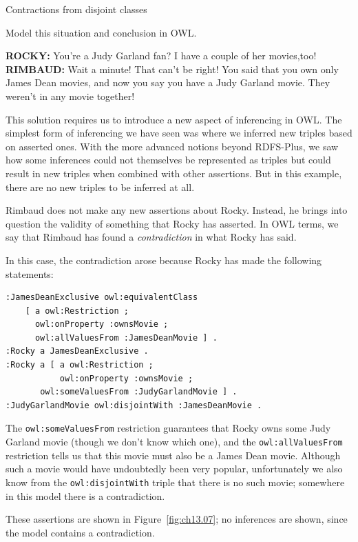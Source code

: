 \begin{challenge}{Contractions from disjoint classes}
\label{chal:37}

Model this situation and conclusion in OWL.

\textbf{ROCKY:} You're a Judy Garland fan? I have a couple of her movies,too!  \\
\textbf{RIMBAUD:} Wait a minute! That can't be right! You said that you own
only James Dean movies, and now you say you have a Judy Garland movie.
They weren't in any movie together!

\solution

This solution requires us to introduce a new aspect of inferencing in
OWL. The simplest form of inferencing we have seen was where we inferred
new triples based on asserted ones. With the more advanced notions
beyond RDFS-Plus, we saw how some inferences could not themselves be
represented as triples but could result in new triples when combined
with other assertions. But in this example, there are no new triples to
be inferred at all.

Rimbaud does not make any new assertions about Rocky. Instead, he brings
into question the validity of something that Rocky has asserted. In OWL
terms, we say that Rimbaud has found a \emph{contradiction} in what Rocky has
said.

In this case, the contradiction arose because Rocky has made the
following statements:

\begin{lstlisting}
:JamesDeanExclusive owl:equivalentClass
    [ a owl:Restriction ;
      owl:onProperty :ownsMovie ;
      owl:allValuesFrom :JamesDeanMovie ] .
:Rocky a JamesDeanExclusive .
:Rocky a [ a owl:Restriction ;
           owl:onProperty :ownsMovie ;
	   owl:someValuesFrom :JudyGarlandMovie ] .
:JudyGarlandMovie owl:disjointWith :JamesDeanMovie .
\end{lstlisting}

The \texttt{owl:someValuesFrom} restriction guarantees that Rocky owns some Judy
Garland movie (though we don't know which one), and the
\texttt{owl:allValuesFrom} restriction tells us that this movie must also be a
James Dean movie. Although such a movie would have undoubtedly been very
popular, unfortunately we also know from the \texttt{owl:disjointWith} triple
that there is no such movie; somewhere in this model there is a
contradiction.

\end{challenge}

These assertions are shown in Figure~\ref{fig:ch13.07}; no inferences are shown,
since the model contains a contradiction.

